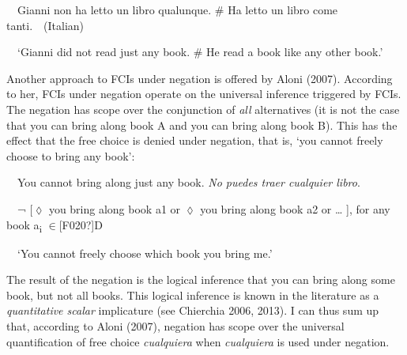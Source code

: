 \begin{styleStandard}
\ \ Gianni non ha letto un libro qualunque. \# Ha letto un libro come tanti.\ \ (Italian)
\end{styleStandard}

\begin{styleStandard}
\ \ ‘Gianni did not read just any book. \# He read a book like any other book.’\ \ 
\end{styleStandard}

\begin{styleStandard}
Another approach to FCIs under negation is offered by Aloni (2007). According to her, FCIs under negation operate on the universal inference triggered by FCIs. The negation has scope over the conjunction of \textit{all} alternatives (it is not the case that you can bring along book A and you can bring along book B). This has the effect that the free choice is denied under negation, that is, ‘you cannot freely choose to bring any book’:
\end{styleStandard}

\clearpage\begin{styleStandard}
\label{bkm:Ref43030327}\ \ You cannot bring along just any book. \textit{No puedes traer cualquier libro}. 
\end{styleStandard}

\begin{styleStandard}
\ \ ¬ [${\lozenge}$ you bring along book a1 or ${\lozenge}$ you bring along book a2 or … ], for any book a\textsubscript{i} ${\in}$[F020?]D
\end{styleStandard}

\begin{styleStandard}
\ \ ‘You cannot freely choose which book you bring me.’
\end{styleStandard}

\begin{styleStandard}
The result of the negation is the logical inference that you can bring along some book, but not all books. This logical inference is known in the literature as a \textit{quantitative scalar} implicature (see Chierchia 2006, 2013). I can thus sum up that, according to Aloni (2007), negation has scope over the universal quantification of free choice \textit{cualquiera} when \textit{cualquiera} is used under negation. 
\end{styleStandard}

